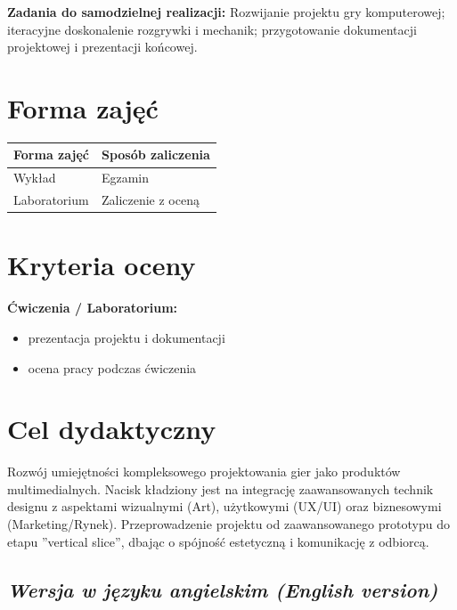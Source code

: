 \documentclass[12pt, a4paper]{article}
\newcommand{\thdrule}{\noalign{\global\setlength{\extrarowheight}{0pt}}}
\newcommand{\thdend}{\noalign{\global\setlength{\extrarowheight}{3pt}}}
\begin{document}
\vspace{4pt}
\noindent\textbf{Zadania do samodzielnej realizacji:} Rozwijanie projektu gry komputerowej; iteracyjne doskonalenie rozgrywki i mechanik; przygotowanie dokumentacji projektowej i prezentacji końcowej.

\section{Forma zajęć}

\begin{center}
{\scriptsize
\begin{tabular}{m{5cm}m{8cm}}
\thdrule\toprule
\rowcolor{pjatkRed} {\color{white}\textbf{Forma zajęć}} & {\color{white}\textbf{Sposób zaliczenia}} \\
\midrule\thdend
  \rowcolor{tableRowLight} Wykład & Egzamin \\
  \rowcolor{tableRowAlt} Laboratorium & Zaliczenie z oceną \\
\bottomrule
\end{tabular}}
\end{center}

\section{Kryteria oceny}

\textbf{Ćwiczenia / Laboratorium:}
\begin{itemize}
  \item prezentacja projektu i dokumentacji
  \item ocena pracy podczas ćwiczenia
\end{itemize}


\section{Cel dydaktyczny}

Rozwój umiejętności kompleksowego projektowania gier jako produktów multimedialnych. Nacisk kładziony jest na integrację zaawansowanych technik designu z aspektami wizualnymi (Art), użytkowymi (UX/UI) oraz biznesowymi (Marketing/Rynek). Przeprowadzenie projektu od zaawansowanego prototypu do etapu ''vertical slice'', dbając o spójność estetyczną i komunikację z odbiorcą.

\subsection*{\textit{Wersja w języku angielskim (English version)}}
\end{document}
